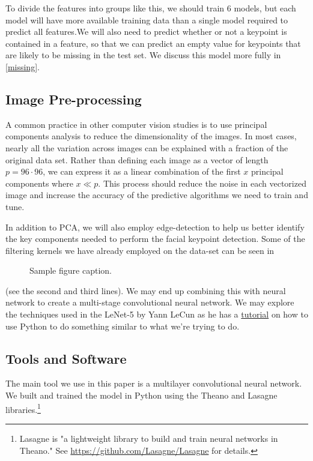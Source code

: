 \documentclass{article}
\begin{document}
To divide the features into groups like this, we should train 6 models, but each model will have more available training data than a single model required to predict all features.We will also need to predict whether or not a keypoint is contained in a feature, so that we can predict an empty value for keypoints that are likely to be missing in the test set. We discuss this model more fully in \ref{missing}.
\subsection{Image Pre-processing}
A common practice in other computer vision studies is to use principal components analysis to reduce the dimensionality of the images. In most cases, nearly all the variation across images can be explained with a fraction of the original data set. Rather than defining each image as a vector of length $p=96\cdot96$, we can express it as a linear combination of the first $x$ principal components where $x \ll p$. This process should reduce the noise in each vectorized image and increase the accuracy of the predictive algorithms we need to train and tune.

In addition to PCA, we will also employ edge-detection to help us better identify the key components needed to perform the facial keypoint detection.  Some of the filtering kernels we have already employed on the data-set can be seen in 
\begin{figure}[!htb]
\begin{center}
\end{center}
\caption{Sample figure caption.}

\end{figure}

 (see the second and third lines).  We may end up combining this with neural network to create a multi-stage convolutional neural network. We may explore the techniques used in the LeNet-5 by Yann LeCun as he has a \href{http://deeplearning.net/tutorial/lenet.html}{tutorial} on how to use Python to do something similar to what we're trying to do.
\subsection{Tools and Software}

The main tool we use in this paper is a multilayer convolutional neural network. We built and trained the model in Python using the Theano and Lasagne libraries.\footnote{Lasagne is "a lightweight library to build and train neural networks in Theano." See \url{https://github.com/Lasagne/Lasagne} for details.}
\end{document}
